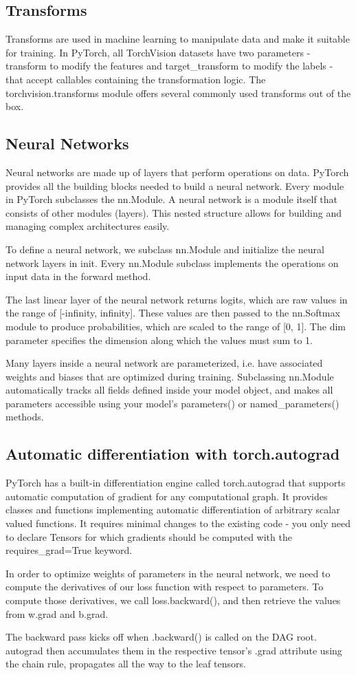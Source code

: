 \subsection{Transforms}

Transforms are used in machine learning to manipulate data and make it suitable for training.
In PyTorch, all TorchVision datasets have two parameters - transform to modify the features and target\_transform to modify the labels - that accept callables containing the transformation logic.
The torchvision.transforms module offers several commonly used transforms out of the box.


\subsection{Neural Networks}
Neural networks are made up of layers that perform operations on data.
PyTorch provides all the building blocks needed to build a neural network.
Every module in PyTorch subclasses the nn.Module.
A neural network is a module itself that consists of other modules (layers).
This nested structure allows for building and managing complex architectures easily.

To define a neural network, we subclass nn.Module and initialize the neural network layers in init.
Every nn.Module subclass implements the operations on input data in the forward method.

The last linear layer of the neural network returns logits, which are raw values in the range of [-infinity, infinity].
These values are then passed to the nn.Softmax module to produce probabilities, which are scaled to the range of [0, 1].
The dim parameter specifies the dimension along which the values must sum to 1.

Many layers inside a neural network are parameterized, i.e. have associated weights and biases that are optimized during training.
Subclassing nn.Module automatically tracks all fields defined inside your model object, and makes all parameters accessible using your model's parameters() or named\_parameters() methods.


\subsection{Automatic differentiation with torch.autograd}
PyTorch has a built-in differentiation engine called torch.autograd that supports automatic computation of gradient for any computational graph.
It provides classes and functions implementing automatic differentiation of arbitrary scalar valued functions.
It requires minimal changes to the existing code - you only need to declare Tensors for which gradients should be computed with the requires\_grad=True keyword.

In order to optimize weights of parameters in the neural network, we need to compute the derivatives of our loss function with respect to parameters.
To compute those derivatives, we call loss.backward(), and then retrieve the values from w.grad and b.grad.

The backward pass kicks off when .backward() is called on the DAG root. autograd then accumulates them in the respective tensor's .grad attribute using the chain rule, propagates all the way to the leaf tensors.
